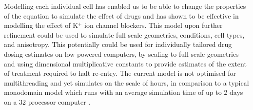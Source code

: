 Modelling each individual cell has enabled us to be able to change the properties of the equation to simulate the effect of drugs and has shown to be effective in modelling the effect of K$^+$ ion channel blockers. This model upon further refinement could be used to simulate full scale geometries, conditions, cell types, and anisotropy. This potentially could be used for individually tailored drug dosing estimates on low powered computers, by scaling to full scale geometries and using dimensional multiplicative constants to provide estimates of the extent of treatment required to halt re-entry. The current model is not optimised for multithreading and yet simulates on the scale of hours, in comparison to a typical monodomain model which runs with an average simulation time of up to 2 days on a 32 processor computer \citep{monodomain}. \par